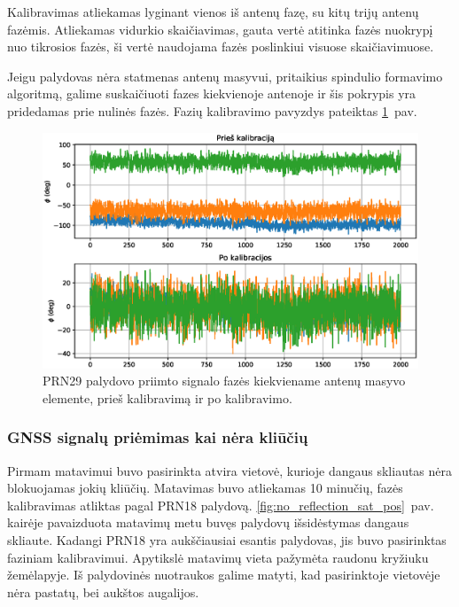 \documentclass[main.tex]{subfiles}
\begin{document}
Kalibravimas atliekamas lyginant vienos iš antenų fazę, su kitų trijų antenų fazėmis.
Atliekamas vidurkio skaičiavimas, gauta vertė atitinka fazės nuokrypį nuo tikrosios
fazės, ši vertė naudojama fazės poslinkiui visuose skaičiavimuose.

Jeigu palydovas nėra statmenas antenų masyvui, pritaikius spindulio formavimo
algoritmą, galime suskaičiuoti fazes kiekvienoje antenoje ir šis pokrypis
yra pridedamas prie nulinės fazės. Fazių kalibravimo pavyzdys pateiktas
\ref{fig:gnss_phase_calibration}~pav.

\begin{figure}[ht]
    \begin{centering}
    \includegraphics[scale=0.65]{drawings/phase_calibration}
    \par\end{centering}
    \protect\caption{\label{fig:gnss_phase_calibration}PRN29 palydovo priimto signalo fazės kiekviename antenų masyvo elemente, prieš kalibravimą ir po kalibravimo.}
\end{figure}

\subsubsection{GNSS signalų priėmimas kai nėra kliūčių}\label{sec:gnss_meas_no_reflection}

Pirmam matavimui buvo pasirinkta atvira vietovė, kurioje dangaus skliautas nėra blokuojamas
jokių kliūčių. Matavimas buvo atliekamas 10 minučių, fazės kalibravimas atliktas pagal PRN18 palydovą.
\ref{fig:no_reflection_sat_pos}~pav. kairėje pavaizduota matavimų metu buvęs palydovų išsidėstymas
dangaus skliaute. Kadangi PRN18 yra aukščiausiai esantis palydovas, jis buvo pasirinktas
faziniam kalibravimui. Apytikslė matavimų vieta pažymėta raudonu kryžiuku žemėlapyje.
Iš palydovinės nuotraukos galime matyti, kad pasirinktoje vietovėje nėra pastatų,
bei aukštos augalijos.
\end{document}

